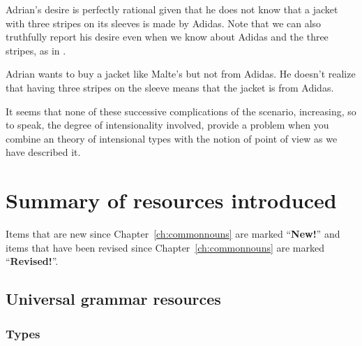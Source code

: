 Adrian's desire is perfectly rational given that he does not know that
a jacket with three stripes on its sleeves is made by Adidas.  Note
that we can also truthfully report his desire even when we know about
Adidas and the three stripes, as in \nexteg{}.
\begin{ex} 
Adrian wants to buy a jacket like Malte's but not from Adidas.  He
doesn't realize that having three stripes on the sleeve means that the
jacket is from Adidas. 
\end{ex} 

It seems that none of these successive complications of the scenario,
increasing, so to speak, the degree of intensionality involved,
provide a problem when you combine an theory of intensional types with
the notion of point of view as we have described it.


 
\section{Summary of resources introduced}
\label{sec:summresch6}


Items that are new since Chapter~\ref{ch:commonnouns} are marked
``\textbf{New!}'' and items that have been revised since
Chapter~\ref{ch:commonnouns} are marked ``\textbf{Revised!}''.  %

\subsection{Universal grammar resources} 

\subsubsection{Types} 

